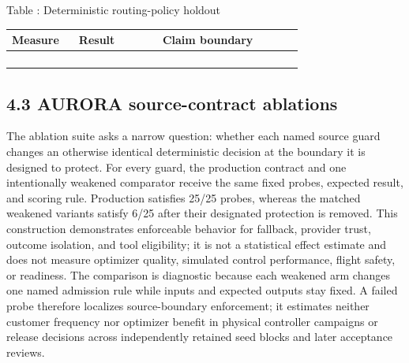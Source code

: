 \begin{center}
\begingroup
\small
\renewcommand{\arraystretch}{0.96}
\textnormal{Table \thetable: Deterministic routing-policy holdout}\par
\vspace{0.22em}
\begin{tabular}{@{}L{0.20\linewidth}C{0.25\linewidth}L{0.42\linewidth}@{}}
\toprule
\textbf{Measure} & \textbf{Result} & \textbf{Claim
boundary}\tabularnewline
\midrule
{} &
 &
\tabularnewline
{} &
 &
\tabularnewline
{} &
 &
\tabularnewline
{} &
 &
\tabularnewline
\bottomrule
\end{tabular}
\endgroup
\end{center}

\subsection{\texorpdfstring{\textbf{4.3 AURORA source-contract
ablations}}{4.3 AURORA source-contract ablations}}\label{aurora-source-contract-ablations}

The ablation suite asks a narrow question: whether each named source
guard changes an otherwise identical deterministic decision at the
boundary it is designed to protect. For every guard, the production
contract and one intentionally weakened comparator receive the same
fixed probes, expected result, and scoring rule. Production satisfies
25/25 probes, whereas the matched weakened variants satisfy 6/25 after
their designated protection is removed. This construction demonstrates
enforceable behavior for fallback, provider trust, outcome isolation,
and tool eligibility; it is not a statistical effect estimate and does
not measure optimizer quality, simulated control performance, flight
safety, or readiness. The comparison is diagnostic because each weakened
arm changes one named admission rule while inputs and expected outputs
stay fixed. A failed probe therefore localizes source-boundary
enforcement; it estimates neither customer frequency nor optimizer benefit
in physical controller campaigns or release decisions across independently
retained seed blocks and later acceptance reviews.

